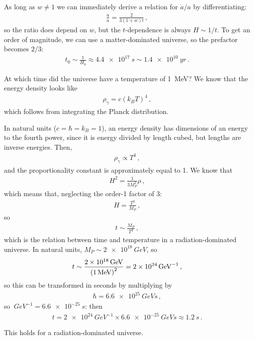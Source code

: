 \documentclass[main.tex]{subfiles}
\begin{document}
As long as \(w \neq 1\) we can immediately derive a relation for \(\dot{a} / a \) by differentiating: 
%
\begin{align}
\frac{\dot{a}}{a} = \frac{2 }{3 (1+w) t}
\,,
\end{align}
%
so the ratio does depend on \(w\), but the \(t\)-dependence is always \(H \sim 1/t\). To get an order of magnitude, we can use a matter-dominated universe, so the prefactor becomes \(2/3\): 
%
\begin{align}
t_0 \sim \frac{1}{H_0} \approx  \SI{4.4e17}{s} \sim \SI{1.4e10}{yr}
\,.
\end{align}
%

At which time did the universe have a temperature of \SI{1 }{MeV}? We know that the energy density looks like 
%
\begin{align}
\rho_{\gamma } = c (k_B T)^{4}
\,,
\end{align}
%
which follows from integrating the Planck distribution. 

In natural units (\(c = \hbar = k_B =1\)), an energy density has dimensions of an energy to the fourth power, since it is energy divided by length cubed, but lengths are inverse energies. Then, 
%
\begin{align}
\rho_{\gamma } \propto T^{4}
\,,
\end{align}
and the proportionality constant is approximately equal to 1. 
We know that 
%
\begin{align}
H^2 = \frac{1}{3 M_P^2} \rho 
\,,
\end{align}
%
which  means that, neglecting the order-1 factor of 3:
%
\begin{align}
H = \frac{T^2}{M_P}
\,,
\end{align}
%
so 
%
\begin{align}
t \sim \frac{M_P}{T^2}
\,,
\end{align}
%
which is the relation between time and temperature in a radiation-dominated universe. In natural units, \(M_P \sim \SI{2e18 }{GeV}\), so 
%
\begin{align}
t \sim \frac{\SI{2e18}{GeV}}{\qty(\SI{1}{MeV})^2} = \SI{2e24}{GeV^{-1}}
\,,
\end{align}
%
so this can be transformed in seconds by multiplying by 
%
\begin{align}
\hbar = \SI{6.6e25}{GeV s}
\,,
\end{align}
%
so \(\SI{}{GeV^{-1}} = \SI{6.6e-25}{s}\): then 
%
\begin{align}
t  = \SI{2e24}{GeV^{-1}} \times \SI{6.6e-25}{GeV s} \approx \SI{1.2}{s}
\,.
\end{align}

This holds for a radiation-dominated universe. 
\end{document}
